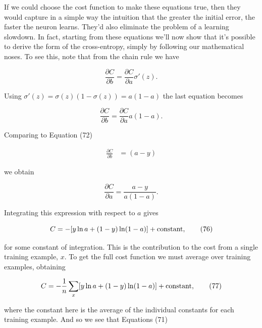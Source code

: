 \noindent If we could choose the cost function to make these equations true, then they would capture in a simple way the intuition that the greater the initial error, the faster the neuron learns. They'd also eliminate the problem of a learning slowdown. In fact, starting from these equations we'll now show that it's possible to derive the form of the cross-entropy, simply by following our mathematical noses. To see this, note that from the chain rule we have

\begin{equation}
\frac{\partial C}{\partial b} = \frac{\partial C}{\partial a} \sigma'(z).
\tag{73}
\end{equation}

\noindent Using $\sigma'(z) = \sigma(z)(1-\sigma(z)) = a(1-a)$ the last equation becomes

\begin{equation}
\frac{\partial C}{\partial b} = \frac{\partial C}{\partial a} a(1-a).
\tag{74}
\end{equation}

\noindent Comparing to Equation (72)

\begin{align*}
\frac{\partial C}{\partial b } &= (a-y) \nonumber
\end{align*}

\noindent we obtain

\begin{equation}
\frac{\partial C}{\partial a} = \frac{a-y}{a(1-a)}.
\tag{75}
\end{equation}

\noindent Integrating this expression with respect to $a$ gives

\begin{equation}
C = -[y \ln a + (1-y) \ln (1-a)]+ {\rm constant},
\tag{76}
\end{equation}

\noindent for some constant of integration. This is the contribution to the cost from a single training example, $x$. To get the full cost function we must average over training examples, obtaining

\begin{equation}
C = -\frac{1}{n} \sum_x [y \ln a +(1-y) \ln(1-a)] + {\rm constant},
\tag{77}
\end{equation}

\noindent where the constant here is the average of the individual constants for each training example. And so we see that Equations (71)

